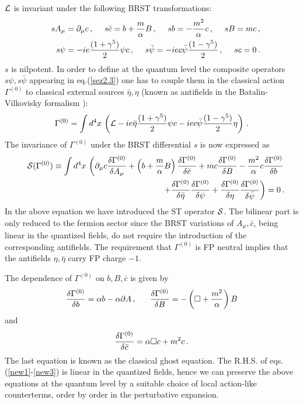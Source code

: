 \documentclass[a4paper,11pt]{article}
\def\G{\Gamma}
\begin{document}
${\cal L}$  is invariant under the following BRST transformations:
%
\begin{eqnarray}
&& s A_\mu = \partial_\mu c \, , ~~~~
s \bar c = b + {m \over \alpha} B \, , ~~~~ sb = -{m^2 \over \alpha} c \, ,  
~~~~ s B= mc \, , \nonumber \\
&& s \psi = -i e  {(1+\gamma^5) \over 2} \psi c \, , ~~~~
s \bar \psi = - i e  c \bar \psi {(1-\gamma^5) \over 2} \, , ~~~~
s c =0 \, .
\label{sez2.3}
\end{eqnarray}
%
$s$ is nilpotent.
In order to define at the quantum level the composite operators
$s \psi, s \bar \psi$ appearing in eq.(\ref{sez2.3}) one has to
couple them in the classical action 
$\G^{(0)}$ to classical external sources  
$\bar \eta, \eta$ 
(known as antifields in the Batalin-Vilkovisky
formalism \cite{GPS}):
%
\begin{eqnarray}
\G^{(0)} = \int d^4x \, \left ( {\cal L} -ie 
\bar \eta {(1+\gamma^5) \over 2} \psi c 
 - i e  c \bar \psi {(1-\gamma^5) \over 2} \eta \right ) \, .
\label{azclass}
\end{eqnarray}
%
The invariance of 
$\G^{(0)}$ under
the BRST differential $s$ is now expressed as \cite{zj}
%
\begin{eqnarray}
&& {\cal S}(\G^{(0)}) \equiv 
\int d^4x \, 
\left (
\partial_\mu c {\delta \G^{(0)} \over \delta A_\mu}
+ \left ( b + {m \over \alpha}B \right ) 
 {\delta \G^{(0)} \over \delta \bar c}
+ mc {\delta \G^{(0)} \over \delta B}
- {m^2 \over \alpha}c {\delta \G^{(0)} \over \delta b} 
\right . \nonumber \\
&& \left . 
~~~~~~~~~~~~~~~~~~~~~~~~ + {\delta \G^{(0)} \over \delta \bar \eta}
{\delta \G^{(0)} \over \delta \psi}
+ {\delta \G^{(0)} \over \delta \eta} 
{\delta \G^{(0)} \over \delta \bar \psi}
\right ) =  0 \, .
\label{sez2.6}
\end{eqnarray}
%
In the above equation we have introduced the ST operator ${\cal S}$.
The bilinear part is only reduced to the fermion sector since
the BRST variations of $A_\mu, \bar c$, being linear in the quantized
fields, do not require the introduction of the corresponding antifields.
The requirement that $\G^{(0)}$ is FP neutral implies that 
the antifields $\eta ,\bar \eta$ carry FP charge $-1$.

The dependence of $\G^{(0)}$ on $b,B,\bar c$ is given by 
%
\begin{eqnarray}
{\delta \G^{(0)} \over \delta b} = \alpha b - \alpha \partial A \, , ~~~~~
{\delta \G^{(0)} \over \delta B} = - \left ( \square  + { m^2 \over \alpha} 
\right ) B 
\label{new1}
\end{eqnarray}
%
and
\begin{eqnarray}
{\delta \G^{(0)} \over \delta \bar c} = \alpha \square c + m^2 c \, .
\label{new3}
\end{eqnarray}
%
The last equation is known as the classical ghost equation. 
The R.H.S. of eqs.(\ref{new1}-\ref{new3}) is linear in the quantized fields, hence
we can preserve the above equations at the quantum level by a suitable choice of local action-like counterterms, order by order in the perturbative expansion.
\end{document}
